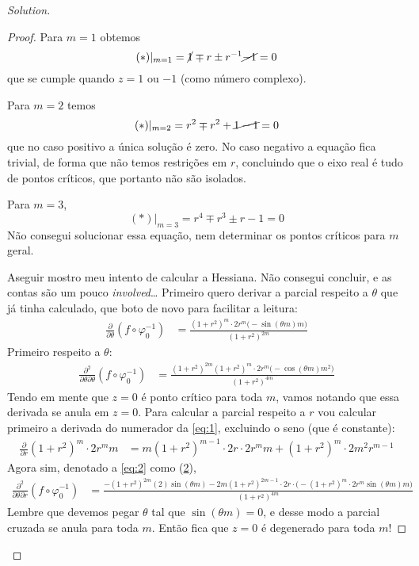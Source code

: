 \begin{proof}[Solution]
\begin{proof}
Para \(m=1\) obtemos
\[(*)|_{m=1}=\cancel{1} \mp r \pm  r^{-1}\cancel{-1}=0\]
que se cumple quando \(z=1\) ou \(-1\) (como  número complexo).

Para \(m=2\) temos
\[(*)|_{m=2}=r^{2} \mp  r^2 +  \cancel{1-1} = 0\]
que no caso positivo a única solução é zero. No caso negativo a equação fica trivial, de forma que não temos restrições em \(r\), concluindo que o eixo real é tudo de pontos críticos, que portanto não são isolados.

Para \(m=3\),
\[(*)|_{m=3}=r^4 \mp  r^3 \pm  r-1=0\]
{\color{2}Não consegui solucionar essa equação, nem determinar os pontos críticos para \(m\) geral}.

{\color{2}Aseguir mostro meu intento de calcular a Hessiana. Não consegui concluir, e as contas são um pouco \textit{involved}…} Primeiro quero derivar a parcial respeito a \(\theta\) que já tinha calculado, que boto de novo para facilitar a leitura:
\begin{align}\label{eq:1}
\frac{\partial }{\partial \theta}(f \circ \varphi_0^{-1})&= \frac{(1+r^2)^m\cdot  2r^m \Big(-\sin(\theta m)m\Big)}{(1+r^2)^{2m}}
\end{align}
Primeiro respeito a \(\theta\):
\begin{align*}
\frac{\partial^2 }{\partial \theta\partial \theta}(f \circ \varphi_0^{-1})&=\frac{(1+r^2)^{2m}(1+r^2)^m\cdot 2r^m \Big(-\cos(\theta m)m^2\Big)}{(1+r^2)^{4m}}
\end{align*}
Tendo em mente que \(z=0\)  é ponto crítico para toda \(m\), vamos notando que essa derivada se anula em \(z=0\). Para calcular a parcial respeito a \(r\) vou calcular primeiro a derivada do numerador da \cref{eq:1}, excluindo o seno (que é constante):
\begin{align}\label{eq:2}
\frac{\partial }{\partial r}(1+r^2)^m\cdot 2r^m m&=m(1+r^2)^{m-1}\cdot 2r\cdot 2r^m m+(1+r^2)^m \cdot 2m^2r^{m-1}
\end{align}
Agora sim, denotado a \cref{eq:2} como (\hyperref[eq:2]{2}),
\begin{align*}
\frac{\partial^2 }{\partial \theta\partial r}(f \circ \varphi_0^{-1})&=\frac{-(1+r^2)^{2m}(\hyperref[eq:2]{2})\sin(\theta m)-2m(1+r^2)^{2m-1}\cdot 2r\cdot \Big(-(1+r^2)^m\cdot 2r^m \sin(\theta m)m\Big)}{(1+r^2)^{4m}}
\end{align*}
Lembre que devemos pegar \(\theta\) tal que \(\sin(\theta m)=0\), e desse modo a parcial cruzada se anula para toda \(m\). Então fica que \(z=0\) é degenerado para toda \(m\)!


\end{proof}
\end{proof}
